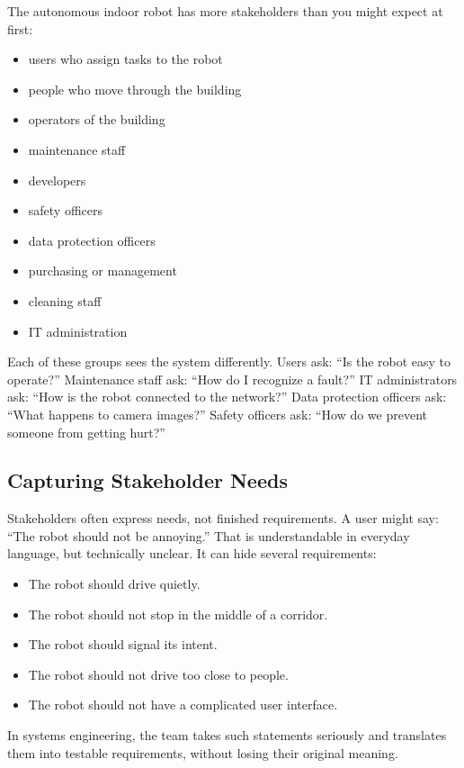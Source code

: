 The autonomous indoor robot has more stakeholders than you might expect at first:

\begin{itemize}
    \item users who assign tasks to the robot
    \item people who move through the building
    \item operators of the building
    \item maintenance staff
    \item developers
    \item safety officers
    \item data protection officers
    \item purchasing or management
    \item cleaning staff
    \item IT administration
\end{itemize}

Each of these groups sees the system differently. Users ask: \enquote{Is the robot easy to operate?} Maintenance staff ask: \enquote{How do I recognize a fault?} IT administrators ask: \enquote{How is the robot connected to the network?} Data protection officers ask: \enquote{What happens to camera images?} Safety officers ask: \enquote{How do we prevent someone from getting hurt?}

\subsection{Capturing Stakeholder Needs}
Stakeholders often express needs, not finished requirements. A user might say: \enquote{The robot should not be annoying.} That is understandable in everyday language, but technically unclear. It can hide several requirements:

\begin{itemize}
    \item The robot should drive quietly.
    \item The robot should not stop in the middle of a corridor.
    \item The robot should signal its intent.
    \item The robot should not drive too close to people.
    \item The robot should not have a complicated user interface.
\end{itemize}

In systems engineering, the team takes such statements seriously and translates them into testable requirements, without losing their original meaning.

